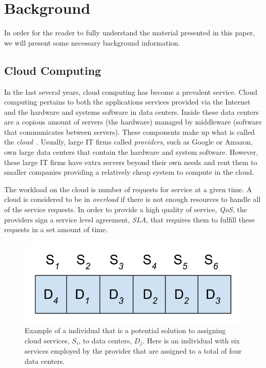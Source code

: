 \documentclass{sig-alternate}
\begin{document}
\section{Background} 
\label{Background}

In order for the reader to fully understand the material presented in this paper, we will present some necessary background information.

\subsection{Cloud Computing}
\label{sec:Cloud Computing}

In the last several years, cloud computing has become a prevalent service. Cloud computing pertains to both the applications services provided via the Internet and the hardware and systems software in data centers. Inside these data centers are a copious amount of servers (the hardware) managed by middleware (software that communicates between servers). These components make up what is called the \emph{cloud}~\cite{Armbrust}. Usually, large IT firms called \emph{providers}, such as Google or Amazon, own large data centers that contain the hardware and system software. However, these large IT firms have extra servers beyond their own needs and rent them to smaller companies providing a relatively cheap system to compute in the cloud. 

The workload on the cloud is number of requests for service at a given time. A cloud is considered to be in \emph{overload} if there is not enough resources to handle all of the service requests. In order to provide a high quality of service, \emph{QoS}, the providers sign a service level agreement, \emph{SLA}, that requires them to fulfill these requests in a set amount of time. 

\begin{figure}[tb]
 \centering
 \includegraphics[height=0.15 \textwidth]{Individual}
 \caption{Example of a individual that is a potential solution to assigning cloud services, $S_i$, to data centers, $D_j$. Here is an individual with six services employed by the provider that are assigned to a total of four data centers.}
 \label{fig:EMOA}
\end{figure}
\end{document}

